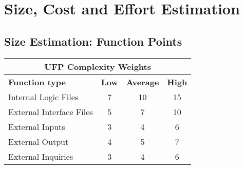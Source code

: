 \section{Size, Cost and Effort Estimation}

\subsection{Size Estimation: Function Points}

\noindent
{
\begin{center}
\begin{tabular}{ lccc }
\hline
\multicolumn{4}{c}{\textbf{UFP Complexity Weights}} \\
\hline
\textbf{Function type} & \textbf{Low} & \textbf{Average} & \textbf{High} \\ 
\hline
Internal Logic Files & 7 & 10 & 15 \\
\hline
External Interface Files & 5 & 7 & 10 \\
\hline
External Inputs & 3 & 4 & 6 \\ 
\hline
External Output & 4 & 5 & 7 \\
\hline
External Inquiries & 3 & 4 & 6 \\
\hline
\end{tabular}
\end{center}
}



